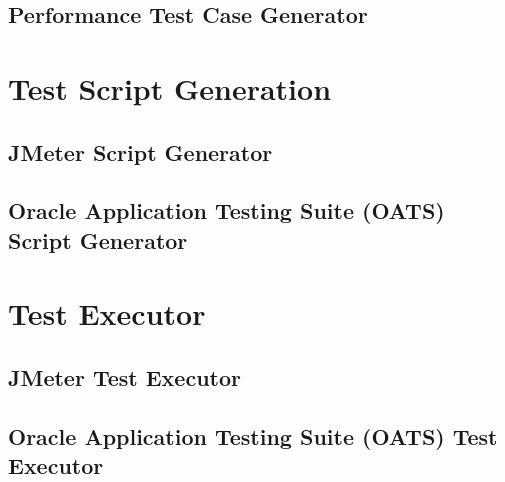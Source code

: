 
\subsection{Performance Test Case Generator}


\section{Test Script Generation}


\subsection{JMeter Script Generator}


\subsection{Oracle Application Testing Suite (OATS) Script Generator}


\section{Test Executor}


\subsection{JMeter Test Executor}


\subsection{Oracle Application Testing Suite (OATS) Test Executor}
